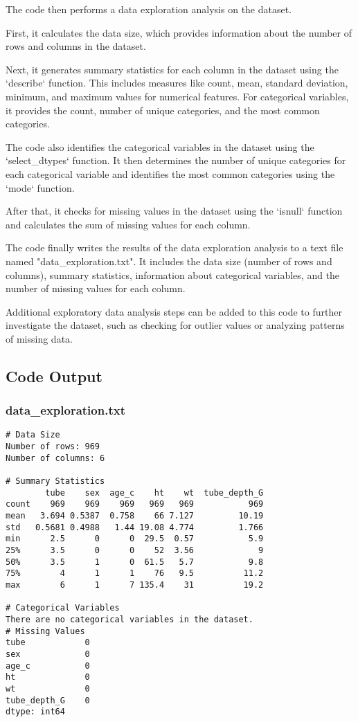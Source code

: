 \documentclass[11pt]{article}
\begin{document}
The code then performs a data exploration analysis on the dataset. 

First, it calculates the data size, which provides information about the number of rows and columns in the dataset.

Next, it generates summary statistics for each column in the dataset using the `describe` function. This includes measures like count, mean, standard deviation, minimum, and maximum values for numerical features. For categorical variables, it provides the count, number of unique categories, and the most common categories.

The code also identifies the categorical variables in the dataset using the `select\_dtypes` function. It then determines the number of unique categories for each categorical variable and identifies the most common categories using the `mode` function.

After that, it checks for missing values in the dataset using the `isnull` function and calculates the sum of missing values for each column.

The code finally writes the results of the data exploration analysis to a text file named "data\_exploration.txt". It includes the data size (number of rows and columns), summary statistics, information about categorical variables, and the number of missing values for each column.

Additional exploratory data analysis steps can be added to this code to further investigate the dataset, such as checking for outlier values or analyzing patterns of missing data.

\subsection{Code Output}

\subsubsection*{data\_exploration.txt}

\begin{Verbatim}[tabsize=4]
# Data Size
Number of rows: 969
Number of columns: 6

# Summary Statistics
        tube    sex  age_c    ht    wt  tube_depth_G
count    969    969    969   969   969           969
mean   3.694 0.5387  0.758    66 7.127         10.19
std   0.5681 0.4988   1.44 19.08 4.774         1.766
min      2.5      0      0  29.5  0.57           5.9
25%      3.5      0      0    52  3.56             9
50%      3.5      1      0  61.5   5.7           9.8
75%        4      1      1    76   9.5          11.2
max        6      1      7 135.4    31          19.2

# Categorical Variables
There are no categorical variables in the dataset.
# Missing Values
tube            0
sex             0
age_c           0
ht              0
wt              0
tube_depth_G    0
dtype: int64


\end{Verbatim}
\end{document}
